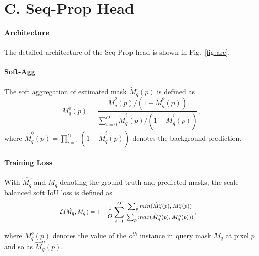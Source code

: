 \documentclass[10pt,twocolumn,letterpaper]{article}
\begin{document}
	\section*{C. Seq-Prop Head} \label{sec:head}
	\vspace{-0.05in}
	\paragraph{Architecture} 
    The detailed architecture of the Seq-Prop head is shown in Fig.~\ref{fig:arc}.
	\vspace{-0.2in}		
	\paragraph{Soft-Agg}
	The soft aggregation \cite{wug2018fast} of estimated mask $\tilde{M}_q(p)$ is defined as 
	\begin{equation}\label{eq:softagg}
	M_q^o(p) = \frac{\tilde{M}_q^o(p)/(1-\tilde{M}_q^o(p))}{\sum_{i=0}^{O}{\tilde{M}_q^i(p)/(1-\tilde{M}_q^i(p))}},
	\end{equation}
	where $\tilde{M}_q^0(p)=\prod_{i=1}^{O}(1-\tilde{M}_q^i(p))$ denotes the background prediction.
\vspace{-0.05in}
	\paragraph{Training Loss}
	With $\hat{M_q}$ and $M_q$ denoting the ground-truth and predicted masks, the scale-balanced soft IoU loss \cite{lin2019agss} is defined as 
	\begin{equation}
	\begin{footnotesize}
	\begin{aligned}
	& \mathcal{L}(\hat{M_q}, M_q) = 1 - \frac{1}{O}\sum_{o=1}^{O}{\frac{\sum_{p}{min(\hat{M}_q^o(p), M_q^o(p))}}
		{\sum_{p}{max(\hat{M}_q^o(p),M_q^o(p)))}}} ,
	\end{aligned}
	\end{footnotesize}
	\label{equ:iouloss}
	\end{equation}
	
	where $M_q^o(p)$ denotes the value of the $o^{th}$ instance in query mask $M_q$ at pixel $p$ and so as $\hat{M}_q^o(p)$.
	
\end{document}
